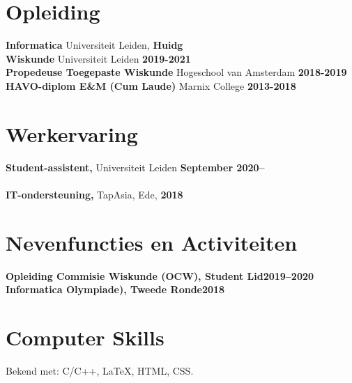 \documentclass[margin,line]{res}
\begin{document}
\newcommand{\myname}{Tim Greven}
\newlength{\mynamewidth}
\settowidth{\mynamewidth}{\namefont\myname}

\name{\hspace*{0.5\textwidth}\hspace{-0.5\mynamewidth} \myname \vspace*{.1in}}
\thispagestyle{empty}






\section{\sc Opleiding}
{\bf Informatica} Universiteit Leiden, \hfill {\bf Huidg}\\

{\bf Wiskunde} Universiteit Leiden \hfill {\bf 2019-2021}\\
{\bf Propedeuse Toegepaste Wiskunde} Hogeschool van Amsterdam \hfill {\bf 2018-2019}\\
{\bf HAVO-diplom E\&M (Cum Laude)} Marnix College \hfill {\bf 2013-2018}\\


\section{\sc Werkervaring}
{\bf Student-assistent,} Universiteit Leiden \hfill {\bf September 2020--}\\
\\
{\bf IT-ondersteuning,} TapAsia, Ede, \hfill {\bf  2018}\\

\vspace{-1em}


\vspace{-1em}


\section{\sc Nevenfuncties en Activiteiten}
{\bf Opleiding Commisie Wiskunde (OCW), Student Lid}\hfill{\bf 2019--2020}
{\bf Informatica Olympiade), Tweede Ronde}\hfill{\bf 2018}



\section{\sc Computer Skills}
Bekend met: C/C++, \LaTeX, HTML, CSS.
\end{document}
